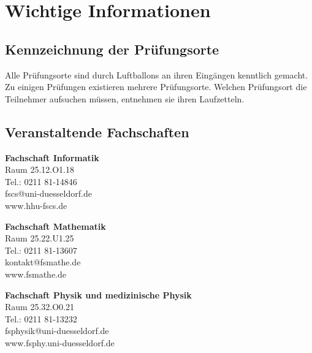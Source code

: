 \documentclass[a4paper,10pt]{article}
\begin{document}
\section[Informationen]{Wichtige Informationen}
\subsection{Kennzeichnung der Prüfungsorte }
Alle Prüfungsorte sind durch Luftballons an ihren Eingängen kenntlich gemacht. Zu einigen Prüfungen existieren mehrere Prüfungsorte. Welchen Prüfungsort die Teilnehmer aufsuchen müssen, entnehmen sie ihren Laufzetteln.

\subsection{Veranstaltende Fachschaften}

\textbf{Fachschaft Informatik}\\
Raum 25.12.O1.18\\
Tel.: 0211 81-14846\\
fscs@uni-duesseldorf.de\\
www.hhu-fscs.de

\textbf{Fachschaft Mathematik}\\
Raum 25.22.U1.25\\
Tel.: 0211 81-13607\\
kontakt@fsmathe.de\\
www.fsmathe.de

\textbf{Fachschaft Physik und medizinische Physik}\\
Raum 25.32.O0.21\\
Tel.: 0211 81-13232\\
fsphysik@uni-duesseldorf.de\\
www.fsphy.uni-duesseldorf.de
\end{document}
